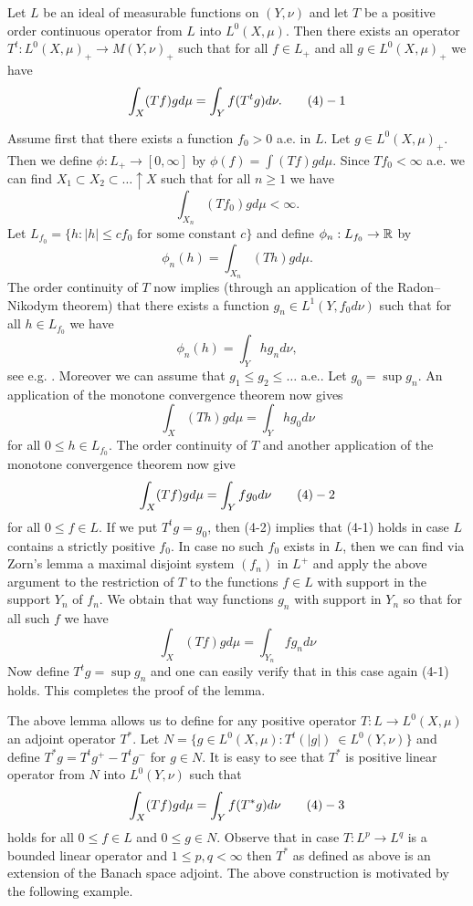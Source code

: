  
 Let $L$ be an ideal of measurable functions on $(Y,\nu )$ and
let $T$ be a positive order continuous operator from $L$ into $L^0(X,\mu )$.
Then there exists an operator $T^t:L^0(X,\mu )_+ \to M(Y,\nu)_+$ such
that for all $f\in L_+$ and all $g\in L^0(X,\mu )_+$ we have
$$\int_X (Tf)g d\mu = \int_Y f (T^tg) d\nu . \tag 4-1$$
\endproclaim

 Assume first that there exists a function $f_0>0$ a.e. in $L$. Let
$g\in L^0(X,\mu )_+$. Then we define $\phi :L_+ \to [0,\infty]$ by
$\phi (f)= \int (Tf)g d\mu$. Since $Tf_0 <\infty$ a.e. we can find $X_1
\subset X_2 \subset \dots \uparrow X$ such that for all $n\ge 1$ we have
$$\int _{X_n} (Tf_0)g d\mu < \infty .$$
Let $L_{f_0} =\{ h: |h| \le cf_0 \text{ for some constant } c\}$ and define
$\phi_n :L_{f_0} \to \Bbb R$ by
$$\phi_n (h)= \int _{X_n}(Th)gd\mu .$$
The order continuity of $T$ now implies (through an application of  the
Radon--Nikodym theorem) that there exists a function $g_n\in L^1(Y,f_0d\nu )$
such that for all $h\in L_{f_0}$ we have
$$\phi_n (h)=\int_Y hg_n d\nu ,$$
see e.g. \cite{Z,theorem 86.3} . Moreover we can assume that $g_1 \le g_2 \le
\dots$ a.e.. Let $g_0 = \operatorname{sup} g_n$. An application of the monotone
convergence theorem now gives
$$\int_X (Th)gd\mu = \int_Y hg_0 d\nu$$
for all $0\le h\in L_{f_0}$. The order continuity of $T$ and another
application of the monotone convergence theorem now give
$$\int_X (Tf)gd\mu = \int_Y fg_0 d\nu \tag 4-2$$
for all $0\le f\in L$. If we put $T^t g= g_0$, then (4-2) implies that (4-1)
holds in case $L$ contains a strictly positive $f_0$. In case no such $f_0$
exists in $L$, then we can find via Zorn's lemma a maximal disjoint system
$(f_n)$ in $L^+$ and apply the above argument to the restriction of $T$ to the
functions $f\in L$ with support in the support $Y_n$ of $f_n$. We obtain that
way functions $g_n$ with support in $Y_n$ so that for all such $f$ we have
$$\int_X (Tf)gd\mu  = \int_{Y_n}fg_nd\nu$$
Now define $T^tg= \operatorname{sup} g_n$ and one can easily verify that in
this case again (4-1) holds. This completes the proof of the lemma.
\enddemo


The above lemma allows us to define for any positive operator $T:L\to
L^0(X,\mu)$ an adjoint operator $T^*$. Let $N= \{ g\in L^0(X,\mu): T^t(|g|)\
\in L^0(Y,\nu )\}$ and define $T^*g= T^tg^+ -T^tg^-$ for $g\in N$. It is easy
to see that $T^*$ is positive linear operator from $N$ into $L^0(Y,\nu)$ such
that $$\int_X (Tf)gd\mu = \int_Y f(T^*g)d\nu \tag 4-3$$
holds for all $0\le f\in L$ and $0\le g\in N$. Observe that in case $T:L^p \to
L^q$ is a bounded linear operator and $1\le p,q<\infty$ then $T^*$ as defined
as  above is an extension of the Banach space adjoint. The above construction
is motivated by the following example.


